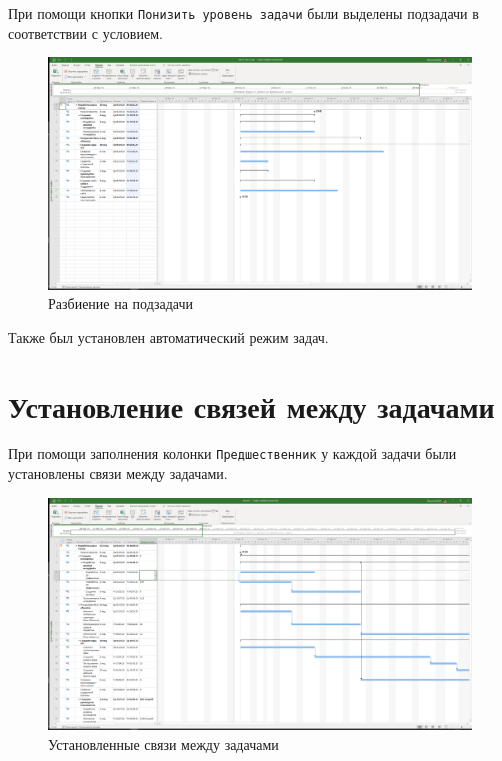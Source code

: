 При помощи кнопки \texttt{Понизить уровень задачи} были выделены подзадачи в соответствии с условием.

\begin{figure}[H]
	\begin{center}
		\includegraphics[width=\textwidth]{imgs/task_3_0.png}
	\end{center}
	\caption{Разбиение на подзадачи}
	\label{img:label}
\end{figure}

Также был установлен автоматический режим задач.

\section{Установление связей между задачами}

При помощи заполнения колонки \texttt{Предшественник} у каждой задачи были установлены связи между задачами.

\begin{figure}[H]
	\begin{center}
		\includegraphics[width=\textwidth]{imgs/task_4_0.png}
	\end{center}
	\caption{Установленные связи между задачами}
	\label{img:label}
\end{figure}